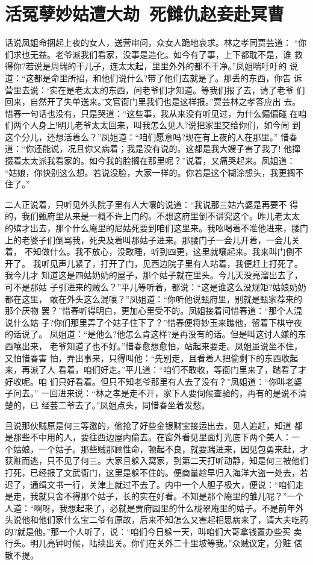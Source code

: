\chapter{活冤孽妙姑遭大劫~死雠仇赵妾赴冥曹}

话说凤姐命捆起上夜的女人，送营审问，众女人跪地哀求。林之孝同贾芸道：
“你们求也无益。老爷派我们看家，没事是造化。如今有了事，上下都耽不是，谁
救得你?若说是周瑞的干儿子，连太太起，里里外外的都不干净。”凤姐喘吁吁的
说道：“这都是命里所招，和他们说什么?带了他们去就是了。那丢的东西，你告
诉营里去说：‘实在是老太太的东西，问老爷们才知道。等我们报了去，请了老爷
们回来，自然开了失单送来。’文官衙门里我们也是这样报。”贾芸林之孝答应出
去。惜春一句话也没有，只是哭道：“这些事，我从来没有听见过，为什么偏偏碰
在咱们两个人身上!明儿老爷太太回来，叫我怎么见人?说把家里交给你们，如今闹
到这个分儿，还想活着么？”凤姐道：“咱们愿意吗?现在有上夜的人在那里。”
惜春道：“你还能说，况且你又病着；我是没有说的。这都是我大嫂子害了我了!
他撺掇着太太派我看家的。如今我的脸搁在那里呢？”说着，又痛哭起来。凤姐道：
“姑娘，你快别这么想。若说没脸，大家一样的。你若是这个糊涂想头，我更搁不
住了。”

二人正说着，只听见外头院子里有人大嚷的说道：“我说那三姑六婆是再要不
得的，我们甄府里从来是一概不许上门的。不想这府里倒不讲究这个。昨儿老太太
的殡才出去，那个什么庵里的尼姑死要到咱们这里来。我吆喝着不准他进来，腰门
上的老婆子们倒骂我，死央及着叫那姑子进来。那腰门子一会儿开着，一会儿关着，
不知做什么。我不放心，没敢睡，听到四更，这里就嚷起来。我来叫门倒不开了。
我听见声儿紧了，打开了门，见西边院子里有人站着，我便赶上打死了。我今儿才
知道这是四姑奶奶的屋子，那个姑子就在里头。今儿天没亮溜出去了，可不是那姑
子引进来的贼么？”平儿等听着，都说：“这是谁这么没规矩?姑娘奶奶都在这里，
敢在外头这么混嚷？”凤姐道：“你听他说甄府里，别就是甄家荐来的那个厌物
罢？”惜春听得明白，更加心里受不的。凤姐接着问惜春道：“那个人混说什么姑
子?你们那里弄了个姑子住下了？”惜春便将妙玉来瞧他，留着下棋守夜的话说了。
凤姐道：“是他么?他怎么肯这样?是再没有的话。但是叫这讨人嫌的东西嚷出来，
老爷知道了也不好。”惜春愈想愈怕，站起来要走。凤姐虽说坐不住，又怕惜春害
怕，弄出事来，只得叫他：“先别走，且看着人把偷剩下的东西收起来，再派了人
看着，咱们好走。”平儿道：“咱们不敢收，等衙门里来了，踏看了才好收呢。咱
们只好看着。但只不知老爷那里有人去了没有？”凤姐道：“你叫老婆子问去。”
一回进来说：“林之孝是走不开，家下人要伺候查验的，再有的是说不清楚的，已
经芸二爷去了。”凤姐点头，同惜春坐着发愁。

且说那伙贼原是何三等邀的，偷抢了好些金银财宝接运出去，见人追赶，知道
都是那些不中用的人，要往西边屋内偷去。在窗外看见里面灯光底下两个美人：一
个姑娘，一个姑子。那些贼那顾性命，顿起不良，就要踹进来，因见包勇来赶，才
获赃而逃，只不见了何三。大家且躲入窝家，到第二天打听动静，知是何三被他们
打死，已经报了文武衙门，这里是躲不住的。便商量趁早归入海洋大盗一处去，若
迟了，通缉文书一行，关津上就过不去了。内中一个人胆子极大，便说：“咱们走
是走，我就只舍不得那个姑子，长的实在好看。不知是那个庵里的雏儿呢？”一个
人道：“啊呀，我想起来了，必就是贾府园里的什么栊翠庵里的姑子。不是前年外
头说他和他们家什么宝二爷有原故，后来不知怎么又害起相思病来了，请大夫吃药
的?就是他。”那一个人听了，说：“咱们今日躲一天，叫咱们大哥拿钱置办些买
卖行头。明儿亮钟时候，陆续出关。你们在关外二十里坡等我。”众贼议定，分赃
俵散不提。

